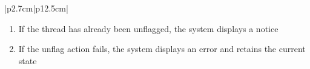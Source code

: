 \begin{table}[H]
\begin{tabular}{|p{2.7cm}|p{12.5cm}|}
\begin{minipage}[t]{\linewidth}
                                      \begin{enumerate}[topsep=0pt,itemsep=1pt,parsep=0pt,partopsep=0pt]
                                          \item If the thread has already been unflagged, the system displays a notice
                                          \item If the unflag action fails, the system displays an error and retains the
                                                current state
                                      \end{enumerate}
                                  \end{minipage}                               \\ \hline
    \end{tabular}
    \label{tab:admin-unflag-thread}
\end{table}
